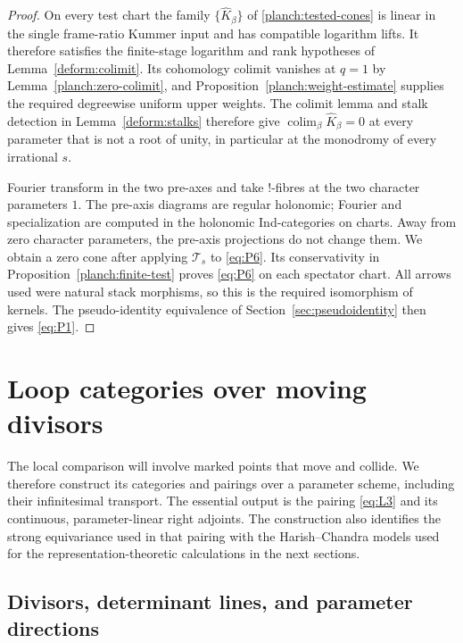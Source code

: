 \documentclass[11pt]{article}
\numberwithin{equation}{section}
\theoremstyle{definition}
\theoremstyle{remark}
\begin{document}
\begin{proof}
On every test chart the family $\{\widehat K_\beta\}$ of
\eqref{planch:tested-cones} is linear in the single frame-ratio Kummer
input and has compatible logarithm lifts.  It therefore satisfies
the finite-stage logarithm and rank hypotheses of
Lemma~\ref{deform:colimit}.  Its cohomology colimit vanishes at
$q=1$ by Lemma~\ref{planch:zero-colimit}, and
Proposition~\ref{planch:weight-estimate} supplies the required
degreewise uniform upper weights.  The colimit lemma and stalk
detection in Lemma~\ref{deform:stalks} therefore give
$\operatorname*{colim}_\beta\widehat K_\beta=0$ at every parameter
that is not a root of unity, in particular at the monodromy of every
irrational $s$.

Fourier transform in the two pre-axes and take $!$-fibres at the
two character parameters $1$.  The pre-axis diagrams are regular
holonomic; Fourier and specialization are computed in the holonomic
Ind-categories on charts.  Away from zero character parameters, the pre-axis
projections do not change them.  We obtain a zero cone after
applying $\mathcal T_s$ to \eqref{eq:P6}.  Its conservativity in
Proposition~\ref{planch:finite-test} proves \eqref{eq:P6} on each
spectator chart.  All arrows used were natural stack morphisms,
so this is the required isomorphism of kernels.  The
pseudo-identity equivalence of Section~\ref{sec:pseudoidentity}
then gives \eqref{eq:P1}.
\end{proof}

\section{Loop categories over moving divisors}\label{sec:loop}

The local comparison will involve marked points that move and collide.  We
therefore construct its categories and pairings over a parameter scheme,
including their infinitesimal transport.  The essential output is the
pairing \eqref{eq:L3} and its continuous, parameter-linear right adjoints.
The construction also identifies the strong equivariance used in that
pairing with the Harish--Chandra models used for the representation-theoretic
calculations in the next sections.

\subsection{Divisors, determinant lines, and parameter directions}
\end{document}
